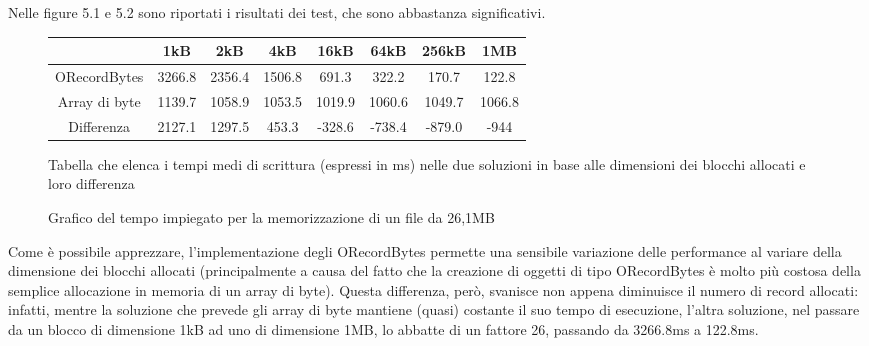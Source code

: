 Nelle figure 5.1 e 5.2 sono riportati i risultati dei test, che sono abbastanza significativi.

\begin{figure}
\centering
\begin{tabular}{cccccccc}
\toprule
\textbf{} & \textbf{1kB} & \textbf{2kB} & \textbf{4kB} & \textbf{16kB} & \textbf{64kB} & \textbf{256kB} & \textbf{1MB}\\
\midrule
ORecordBytes & 3266.8 & 2356.4 & 1506.8 & 691.3 & 322.2 & 170.7 & 122.8 \\
Array di byte & 1139.7 & 1058.9 & 1053.5 & 1019.9 & 1060.6 & 1049.7 & 1066.8\\
Differenza & 2127.1 & 1297.5 & 453.3 & -328.6 & -738.4 & -879.0 & -944\\
\bottomrule
\end{tabular}
\caption{Tabella che elenca i tempi medi di scrittura (espressi in ms) nelle due soluzioni in base alle dimensioni dei blocchi allocati e loro differenza}
\label{:}
\end{figure}

\begin{figure}
\centering
{}
\caption{Grafico del tempo impiegato per la memorizzazione di un file da 26,1MB}
\label{:}
\end{figure}

Come è possibile apprezzare, l'implementazione degli ORecordBytes permette una sensibile variazione delle performance al variare della dimensione dei blocchi allocati (principalmente a causa del fatto che la creazione di oggetti di tipo ORecordBytes è molto più costosa della semplice allocazione in memoria di un array di byte). Questa differenza, però, svanisce non appena diminuisce il numero di record allocati: infatti, mentre la soluzione che prevede gli array di byte mantiene (quasi) costante il suo tempo di esecuzione, l'altra soluzione, nel passare da un blocco di dimensione 1kB ad uno di dimensione 1MB, lo abbatte di un fattore 26, passando da 3266.8ms a 122.8ms.

